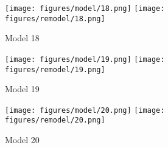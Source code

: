 \begin{figure}
  \centering
  \texttt{[image: figures/model/18.png]}
  \texttt{[image: figures/remodel/18.png]}
  \caption{Model 18}
  \label{fig:model18}
\end{figure}

\begin{figure}
  \centering
  \texttt{[image: figures/model/19.png]}
  \texttt{[image: figures/remodel/19.png]}
  \caption{Model 19}
  \label{fig:model19}
\end{figure}

\begin{figure}
  \centering
  \texttt{[image: figures/model/20.png]}
  \texttt{[image: figures/remodel/20.png]}
  \caption{Model 20}
  \label{fig:model20}
\end{figure}
